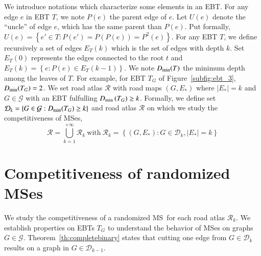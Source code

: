 \documentclass[preprint]{elsarticle}
\newcommand{\set}[1]{\left\{ #1 \right\}}
\newcommand{\card}[1]{\left| #1 \right|}
\newcommand{\mcalg}{\mathcal{G}}
\newcommand{\mcalr}{\mathcal{R}}
\newcommand{\mcald}{\mathcal{D}}
\newcommand{\mts}{MS}
\newcommand{\dmin}{D_{\mbox{\scriptsize{min}}}}
\begin{document}
We introduce notations which characterize some elements in an EBT. For any edge $e$ in EBT $T$, we note $P(e)$ the parent edge of $e$. Let $U(e)$ denote the ``uncle'' of edge $e$, which has the same parent than $P(e)$. Put formally, $U(e) = \set{e' \in T : P(e') = P\left(P(e)\right) = P^2(e)}$. For any EBT $T$, we define recursively a set of edges $E_T(k)$ which is the set of edges with depth $k$. Set $E_T(0)$ represents the edges connected to the root $t$ and $E_T(k) = \set{e : P(e) \in E_T(k-1)}$. We note $\dmin(T)$ the minimum depth among the leaves of $T$. For example, for EBT $T_G$ of Figure~\ref{subfig:ebt_3}, $\dmin(T_G) = 2$. We set road atlas $\mcalr$ with road maps $\left(G,E_*\right)$ where $\card{E_*} = k$ and $G \in \mcalg$ with an EBT fulfulling $\dmin\left(T_G\right) \geq k$. Formally, we define set $\mcald_k = \set{G \in \mcalg : \dmin(T_G) \geq k}$ and road atlas $\mcalr$ on which we study the competitiveness of \mts es,
\[
\mcalr = \bigcup\limits_{k=1}^{+\infty} \mcalr_k ~\mbox{with}~
\mcalr_k = \set{\left(G ,E_*\right): G \in \mcald_k, \card{E_*} = k}
\]

\section{Competitiveness of randomized \mts es} \label{sec:competitiveness}

We study the competitiveness of a randomized \mts ~for each road atlas $\mcalr_k$. We establish properties on EBTs $T_G$ to understand the behavior of \mts es on graphs $G \in \mcalg$. Theorem~\ref{th:completebinary} states that cutting one edge from $G \in \mcald_k$ results on a graph in $G \in \mcald_{k-1}$.
\end{document}
